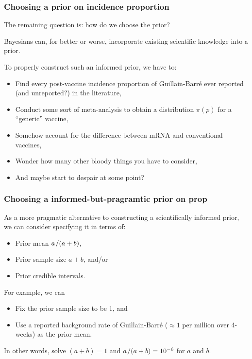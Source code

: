 \documentclass[18pt]{beamer}
\newenvironment{narrowItemize}[1][]{%
  \vspace{-.3\baselineskip}%
  \begin{itemize}[#1]
  \addtolength\itemsep{-.1\baselineskip}
}{
  \end{itemize}
}
\newcommand{\divby}{\thinnerspace /}
\newcommand{\thinnerspace}{\mskip.5\thinmuskip}
\newcommand{\density}{\pi}
\begin{document}
\renewcommand{\frametitleText}{Choosing a prior on incidence proportion}
\begin{frame}
\frametitle{\frametitleText}
The remaining question is: how do we choose the prior?

\pause
Bayesians can, for better or worse, incorporate existing scientific knowledge into a prior.

\pause
To properly construct such an informed prior, we have to:
\pause%
\begin{narrowItemize}[<+->]
\item Find every post-vaccine incidence proportion of Guillain-Barré ever reported (and unreported?) in the literature, 
\item Conduct some sort of meta-analysis to obtain a distribution $\density(p)$ for a ``generic'' vaccine, 
\item Somehow account for the difference between mRNA and conventional vaccines, 
\item Wonder how many other bloody things you have to consider,
\item And maybe start to despair at some point?
\end{narrowItemize}
\end{frame}


\renewcommand{\frametitleText}{Choosing a informed-but-pragramtic prior on prop}
\begin{frame}
\frametitle{\frametitleText}
\vspace*{-.3\baselineskip}
As a more pragmatic alternative to constructing a scientifically informed prior, we can consider specifying it in terms of: 
\vspace*{-.1\baselineskip}
\begin{narrowItemize}
\item Prior mean $a \divby (a + b)$,
\item Prior sample size $a + b$, and/or
\item Prior credible intervals.
\end{narrowItemize}
\vspace*{-.1\baselineskip}

\pause
\begin{minipage}[t][.35\paperheight]{\textwidth}
For example, we can 
\begin{itemize}
\addtolength\itemsep{-.1\baselineskip}
\item Fix the prior sample size to be $1$, and
\item Use a reported background rate of Guillain-Barré ($\approx 1$ per million over 4-weeks) as the prior mean.
\end{itemize}
\pause
In other words, solve $(a + b) = 1$ and $a \divby (a + b) = 10^{-6}$ for $a$ and $b$. %
\end{minipage}

\end{frame}
\end{document}
